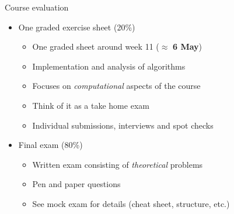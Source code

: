 \begin{frame}{Course evaluation}
    \begin{itemize}
        \item One graded exercise sheet \alert{(20\%)}
            \begin{itemize}
                \item \alert{One graded sheet}
                    around week 11 ($\approx$ \textbf{6 May})
                \item \alert{Implementation and analysis of algorithms}
                \item Focuses on \textit{computational} aspects of the course
                \item Think of it as a \alert{take home exam}
                \item Individual submissions, interviews and spot checks
            \end{itemize}
        \vspace{2em}
        \item Final exam \alert{(80\%)}
            \begin{itemize}
                \item \alert{Written exam}
                    consisting of \textit{theoretical} problems
                \item Pen and paper questions
                \item See mock exam for details \textcolor{grey5}{(cheat sheet, structure, etc.)}
            \end{itemize}
    \end{itemize}
\end{frame}

